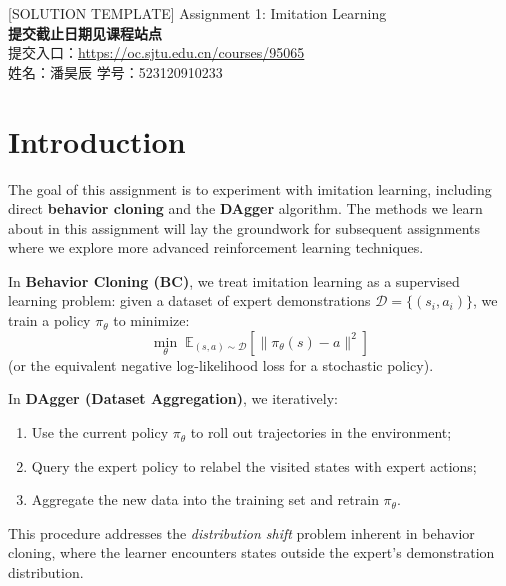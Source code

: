 \documentclass{article}
\begin{document}

\begin{centering}
    {\Large [SOLUTION TEMPLATE] Assignment 1: Imitation Learning} \\
    \vspace{.25cm}
    \textbf{提交截止日期见课程站点} \\
    \vspace{.15cm}
    提交入口：\url{https://oc.sjtu.edu.cn/courses/95065} \\
    \vspace{.15cm}
    姓名：潘昊辰 \quad 学号：523120910233 \\
\end{centering}

\vspace{0.5cm}

\section{Introduction}

The goal of this assignment is to experiment with imitation learning, including direct \textbf{behavior cloning} and the \textbf{DAgger} algorithm.
The methods we learn about in this assignment will lay the groundwork for subsequent assignments where we explore more advanced reinforcement learning techniques.

In \textbf{Behavior Cloning (BC)}, we treat imitation learning as a supervised learning problem: given a dataset of expert demonstrations $\mathcal{D} = \{(s_i, a_i)\}$, we train a policy $\pi_\theta$ to minimize:
\[
\min_\theta \; \mathbb{E}_{(s,a)\sim\mathcal{D}} \left[\| \pi_\theta(s) - a \|^2 \right]
\]
(or the equivalent negative log-likelihood loss for a stochastic policy).

In \textbf{DAgger (Dataset Aggregation)}, we iteratively:
\begin{enumerate}
    \item Use the current policy $\pi_\theta$ to roll out trajectories in the environment;
    \item Query the expert policy to relabel the visited states with expert actions;
    \item Aggregate the new data into the training set and retrain $\pi_\theta$.
\end{enumerate}
This procedure addresses the \emph{distribution shift} problem inherent in behavior cloning, where the learner encounters states outside the expert's demonstration distribution.
\end{document}
